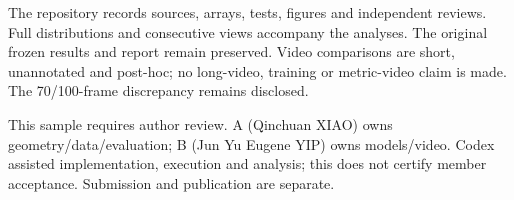 \documentclass[10pt,twocolumn,letterpaper]{article}
\begin{document}
The repository records sources, arrays, tests, figures and independent reviews. Full distributions and consecutive views accompany the analyses. The original frozen results and report remain preserved. Video comparisons are short, unannotated and post-hoc; no long-video, training or metric-video claim is made. The 70/100-frame discrepancy remains disclosed.

This sample requires author review. A (Qinchuan XIAO) owns geometry/data/evaluation; B (Jun Yu Eugene YIP) owns models/video. Codex assisted implementation, execution and analysis; this does not certify member acceptance. Submission and publication are separate.
\clearpage
{\small}
\end{document}
